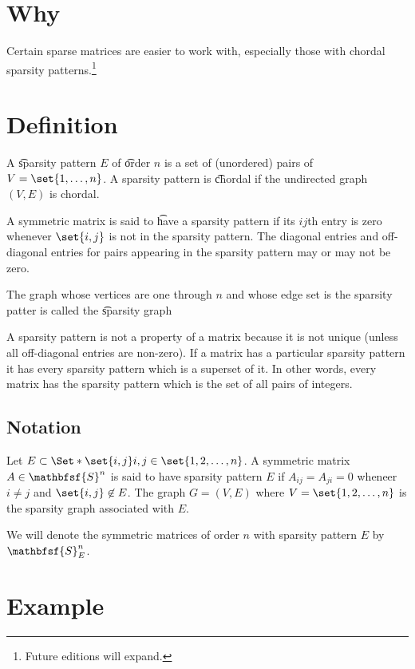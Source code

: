 

\section*{Why}

Certain sparse matrices are easier to work with, especially those with chordal sparsity patterns.\footnote{Future editions will expand.}

\section*{Definition}

A \t{sparsity pattern} $E$ of \t{order} $n$ is a set of (unordered) pairs of $V = \set{1, \dots , n}$.
A sparsity pattern is \t{chordal} if the undirected graph $(V, E)$ is chordal.

A symmetric matrix is said to \t{have a sparsity pattern} if its $ij$th entry is zero whenever $\set{i, j}$ is not in the sparsity pattern. The diagonal entries and off-diagonal entries for pairs appearing in the sparsity pattern may or may not be zero.

The graph whose vertices are one through $n$ and whose edge set is the sparsity patter is called the \t{sparsity graph}

A sparsity pattern is not a property of a matrix because it is not unique (unless all off-diagonal entries are non-zero). If a matrix has a particular sparsity pattern it has every sparsity pattern which is a superset of it.
In other words, every matrix has the sparsity pattern which is the set of all pairs of integers.

\subsection*{Notation}

Let $E \subset \Set*{\set{i, j}}{i, j \in \set{1, 2, \dots , n}}$.
A symmetric matrix $A \in \mathbfsf{S} ^n$ is said to have sparsity pattern $E$ if $A_{ij} = A_{ji} = 0$ wheneer $i \neq j$ and $\set{i, j} \not\in E$.
The graph $G = (V, E)$ where $V = \set{1, 2, \dots , n}$ is the sparsity graph associated with $E$.

We will denote the symmetric matrices of order $n$ with sparsity pattern $E$ by $\mathbfsf{S} ^n_{E}$.

\section*{Example}

